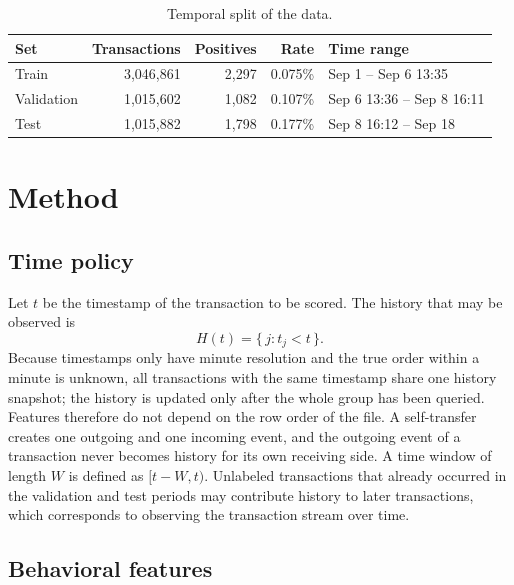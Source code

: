 \documentclass[sigconf,nonacm]{acmart}
\begin{document}
\begin{table}[t]
\caption{Temporal split of the data.}
\label{tab:split}
\small
\setlength{\tabcolsep}{3pt}
\begin{tabular}{lrrrl}
\toprule
Set & Transactions & Positives & Rate & Time range \\
\midrule
Train & 3,046,861 & 2,297 & 0.075\% & Sep 1 -- Sep 6 13:35 \\
Validation & 1,015,602 & 1,082 & 0.107\% & Sep 6 13:36 -- Sep 8 16:11 \\
Test & 1,015,882 & 1,798 & 0.177\% & Sep 8 16:12 -- Sep 18 \\
\bottomrule
\end{tabular}
\end{table}

\section{Method}

\subsection{Time policy}

Let $t$ be the timestamp of the transaction to be scored. The history that may be observed is
\begin{equation}
H(t) = \{\, j : t_j < t \,\}.
\end{equation}
Because timestamps only have minute resolution and the true order within a minute is unknown, all transactions with
the same timestamp share one history snapshot; the history is updated only after the whole group has been queried.
Features therefore do not depend on the row order of the file. A self-transfer creates one outgoing and one incoming
event, and the outgoing event of a transaction never becomes history for its own receiving side. A time window of
length $W$ is defined as $[t-W, t)$. Unlabeled transactions that already occurred in the validation and test periods
may contribute history to later transactions, which corresponds to observing the transaction stream over time.

\subsection{Behavioral features}
\end{document}

